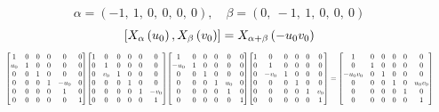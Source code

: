 \documentclass[11pt]{article}
\theoremstyle{definition}
\begin{document}
\[
\alpha = \left( -1, \  1, \  0, \  0, \  0, \  0\right), \quad \beta = \left( 0, \  -1, \  1, \  0, \  0, \  0\right)
\]
\[
\scaletoalign{\textwidth}{\left[ X_{\alpha}\left(u_{0}\right), X_{\beta}\left(v_{0}\right) \right] = X_{\alpha + \beta}\left(- u_{0} v_{0}\right)}
\]
\[
\scaletoalign{\textwidth}{{\left[\begin{matrix}1 & 0 & 0 & 0 & 0 & 0\\u_{0} & 1 & 0 & 0 & 0 & 0\\0 & 0 & 1 & 0 & 0 & 0\\0 & 0 & 0 & 1 & - u_{0} & 0\\0 & 0 & 0 & 0 & 1 & 0\\0 & 0 & 0 & 0 & 0 & 1\end{matrix}\right]} {\left[\begin{matrix}1 & 0 & 0 & 0 & 0 & 0\\0 & 1 & 0 & 0 & 0 & 0\\0 & v_{0} & 1 & 0 & 0 & 0\\0 & 0 & 0 & 1 & 0 & 0\\0 & 0 & 0 & 0 & 1 & - v_{0}\\0 & 0 & 0 & 0 & 0 & 1\end{matrix}\right]} {\left[\begin{matrix}1 & 0 & 0 & 0 & 0 & 0\\- u_{0} & 1 & 0 & 0 & 0 & 0\\0 & 0 & 1 & 0 & 0 & 0\\0 & 0 & 0 & 1 & u_{0} & 0\\0 & 0 & 0 & 0 & 1 & 0\\0 & 0 & 0 & 0 & 0 & 1\end{matrix}\right]} {\left[\begin{matrix}1 & 0 & 0 & 0 & 0 & 0\\0 & 1 & 0 & 0 & 0 & 0\\0 & - v_{0} & 1 & 0 & 0 & 0\\0 & 0 & 0 & 1 & 0 & 0\\0 & 0 & 0 & 0 & 1 & v_{0}\\0 & 0 & 0 & 0 & 0 & 1\end{matrix}\right]} = {\left[\begin{matrix}1 & 0 & 0 & 0 & 0 & 0\\0 & 1 & 0 & 0 & 0 & 0\\- u_{0} v_{0} & 0 & 1 & 0 & 0 & 0\\0 & 0 & 0 & 1 & 0 & u_{0} v_{0}\\0 & 0 & 0 & 0 & 1 & 0\\0 & 0 & 0 & 0 & 0 & 1\end{matrix}\right]}}
\]
\end{document}
